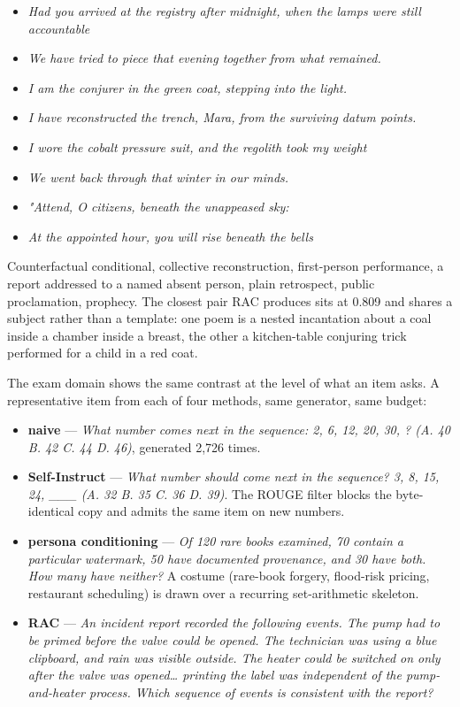 \documentclass[
  11pt,
]{article}
\providecommand{\tightlist}{%
  \setlength{\itemsep}{0pt}\setlength{\parskip}{0pt}}
\theoremstyle{plain}
\theoremstyle{definition}
\providecommand{\tightlist}{%
  \setlength{\itemsep}{0pt}\setlength{\parskip}{0pt}}
\begin{document}
\begin{itemize}
\tightlist
\item
  \emph{Had you arrived at the registry after midnight, when the lamps
  were still accountable}
\item
  \emph{We have tried to piece that evening together from what
  remained.}
\item
  \emph{I am the conjurer in the green coat, stepping into the light.}
\item
  \emph{I have reconstructed the trench, Mara, from the surviving datum
  points.}
\item
  \emph{I wore the cobalt pressure suit, and the regolith took my
  weight}
\item
  \emph{We went back through that winter in our minds.}
\item
  \emph{"Attend, O citizens, beneath the unappeased sky:}
\item
  \emph{At the appointed hour, you will rise beneath the bells}
\end{itemize}

Counterfactual conditional, collective reconstruction, first-person
performance, a report addressed to a named absent person, plain
retrospect, public proclamation, prophecy. The closest pair RAC produces
sits at 0.809 and shares a subject rather than a template: one poem is a
nested incantation about a coal inside a chamber inside a breast, the
other a kitchen-table conjuring trick performed for a child in a red
coat.

The exam domain shows the same contrast at the level of what an item
asks. A representative item from each of four methods, same generator,
same budget:

\begin{itemize}
\tightlist
\item
  \textbf{naive} --- \emph{What number comes next in the sequence: 2, 6,
  12, 20, 30, ? (A. 40 B. 42 C. 44 D. 46)}, generated 2,726 times.
\item
  \textbf{Self-Instruct} --- \emph{What number should come next in the
  sequence? 3, 8, 15, 24, \_\_\_ (A. 32 B. 35 C. 36 D. 39)}. The ROUGE
  filter blocks the byte-identical copy and admits the same item on new
  numbers.
\item
  \textbf{persona conditioning} --- \emph{Of 120 rare books examined, 70
  contain a particular watermark, 50 have documented provenance, and 30
  have both. How many have neither?} A costume (rare-book forgery,
  flood-risk pricing, restaurant scheduling) is drawn over a recurring
  set-arithmetic skeleton.
\item
  \textbf{RAC} --- \emph{An incident report recorded the following
  events. The pump had to be primed before the valve could be opened.
  The technician was using a blue clipboard, and rain was visible
  outside. The heater could be switched on only after the valve was
  opened\ldots{} printing the label was independent of the
  pump-and-heater process. Which sequence of events is consistent with
  the report?}
\end{itemize}
\end{document}
